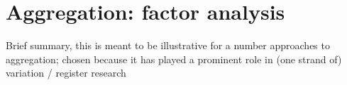\section{Aggregation: factor analysis}

Brief summary, this is meant to be illustrative for a number approaches to aggregation; chosen because it has played a prominent role in (one strand of) variation / register research
